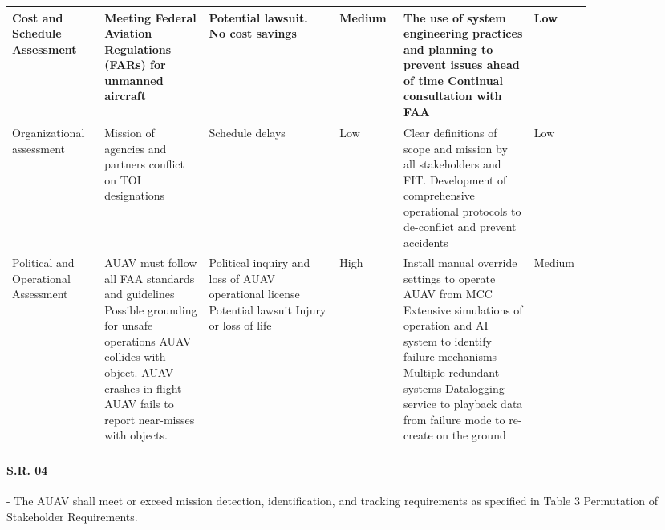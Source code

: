 \begin{fullwidth}
\begin{landscape}
{\begin{longtable}{| L{0.12\linewidth} | L{0.16\linewidth} |  L{0.20\linewidth} | L{0.08\linewidth} | L{0.20\linewidth} | L{0.08\linewidth} |}
        \hline
        Cost and Schedule \newline Assessment & Meeting Federal Aviation Regulations (FARs) for unmanned aircraft & Potential lawsuit. \newline No cost savings &  Medium & The use of system engineering practices and planning to prevent issues ahead of time \newline Continual consultation with FAA &  Low \\
        \hline
        Organizational assessment & Mission of agencies and partners conflict on TOI designations & Schedule delays &  Low & Clear definitions of scope and mission by all stakeholders and FIT. \newline Development of comprehensive operational protocols to de-conflict and prevent accidents &  Low \\
        \hline
        Political and Operational Assessment & AUAV must follow all FAA standards and guidelines \newline Possible grounding for unsafe operations \newline AUAV collides with object. \newline AUAV crashes in flight \newline AUAV fails to report near-misses with objects. & Political inquiry and loss of AUAV operational license \newline Potential lawsuit \newline Injury or loss of life &  High &  Install manual override settings to operate AUAV from MCC \newline Extensive simulations of operation and AI system to identify failure mechanisms \newline Multiple redundant systems \newline Datalogging service to playback data from failure mode to re-create on the ground &  Medium
        \label{tab:sr03_feasibility}
    \end{longtable}
    }
    
    
    \paragraph{S.R. 04} - The AUAV shall meet or exceed mission detection, identification, and tracking requirements as specified in Table 3 Permutation of Stakeholder Requirements.
    

\end{landscape}
\end{fullwidth}

